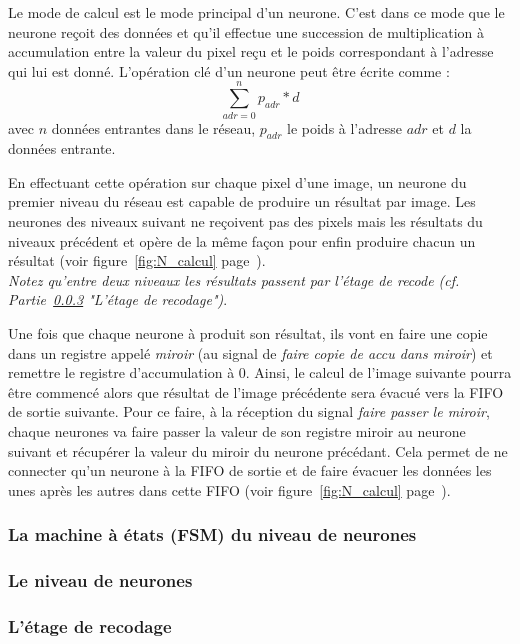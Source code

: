 	Le mode de calcul est le mode principal d'un neurone. C'est dans ce mode que le neurone 
	reçoit des données et qu'il effectue une succession de multiplication à accumulation entre 
	la valeur du pixel reçu et le poids correspondant à l'adresse qui lui est donné. L'opération clé 
	d'un neurone peut être écrite comme :
	$$\sum_{adr=0}^n p_{adr}*d$$
	avec $n$ données entrantes dans le réseau, $p_{adr}$ le poids à l'adresse $adr$ 
	et $d$ la données entrante. 

	En effectuant cette opération sur chaque pixel d'une image, un neurone du premier niveau du réseau
	est capable de produire un résultat par image. Les neurones des niveaux suivant ne reçoivent 
	pas des pixels mais les résultats du niveaux précédent et opère de la même façon pour enfin 
	produire chacun un résultat (voir figure~\ref{fig:N_calcul} page~\pageref{fig:N_calcul}).
	\\{\em Notez qu'entre deux niveaux les résultats passent par l'étage de recode 
	(cf. Partie~\ref{plan:recode} "L'étage de recodage")}.
	
	Une fois que chaque neurone à produit son résultat, ils vont en faire une copie dans 
	un registre appelé {\em miroir} (au signal de {\em faire copie de accu dans miroir}) 
	et remettre le registre d'accumulation à 0. Ainsi, le calcul de l'image suivante pourra 
	être commencé alors que résultat de l'image précédente 
	sera évacué vers la FIFO de sortie suivante. Pour ce faire, à la réception du signal 
	{\em faire passer le miroir}, chaque neurones va faire passer la valeur de son 
	registre miroir au neurone suivant et récupérer la valeur du miroir du neurone précédant.
	Cela permet de ne connecter qu'un neurone à la FIFO de sortie 
	et de faire évacuer les données les unes après les autres dans cette FIFO 
	(voir figure~\ref{fig:N_calcul} page~\pageref{fig:N_calcul}).
	
\subsubsection{La machine à états (FSM) du niveau de neurones}

\subsubsection{Le niveau de neurones}
\subsubsection{L'étage de recodage}
\label{plan:recode}

